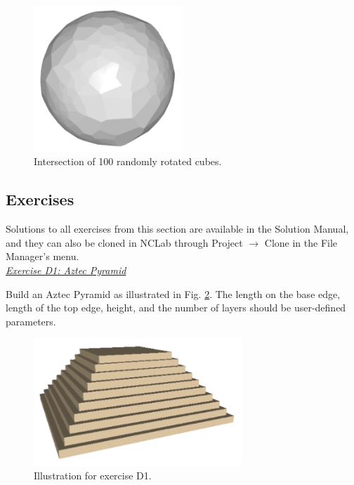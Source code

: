 \documentclass[article,A4,12pt]{llncs}
\begin{document}
\newpage

\begin{figure}[!ht]
\begin{center}
\includegraphics[width=0.5\textwidth]{img/random_cubes.png}
\end{center}
\vspace{-2mm}
\caption{Intersection of 100 randomly rotated cubes.}
\label{fig:random_cubes}
\end{figure}
\noindent

\subsection{Exercises}

Solutions to all exercises from this section are available in the Solution Manual, and 
they can also be cloned in NCLab through Project $\rightarrow$ Clone in the 
File Manager's menu.\\

\noindent
\underline{\em Exercise D1: Aztec Pyramid}

Build an Aztec Pyramid as illustrated in Fig. \ref{fig:aztec}. The length 
on the base edge, length of the top edge, height, and the number of layers
should be user-defined parameters. 

\newpage

\begin{figure}[!ht]
\begin{center}
\includegraphics[width=0.7\textwidth]{img/aztec.png}
\end{center}
\vspace{-2mm}
\caption{Illustration for exercise D1.}
\label{fig:aztec}
\end{figure}
\noindent
\end{document}
